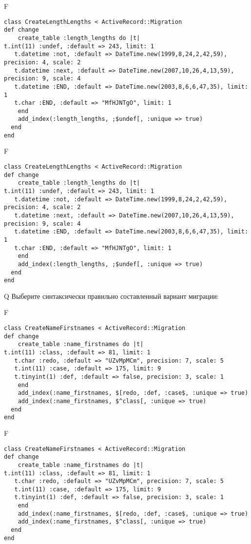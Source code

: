 F
\begin{verbatim}
class CreateLengthLengths < ActiveRecord::Migration
def change
	create_table :length_lengths do |t|
t.int(11) :undef, :default => 243, limit: 1
   t.datetime :not, :default => DateTime.new(1999,8,24,2,42,59), precision: 4, scale: 2
   t.datetime :next, :default => DateTime.new(2007,10,26,4,13,59), precision: 9, scale: 4
   t.datetime :END, :default => DateTime.new(2003,8,6,6,47,35), limit: 1
   t.char :END, :default => "MfHJNTgO", limit: 1
   	end
	add_index(:length_lengths, ;$undef[, :unique => true)
  end 
end

\end{verbatim}

F
\begin{verbatim}
class CreateLengthLengths < ActiveRecord::Migration
def change
	create_table :length_lengths do |t|
t.int(11) :undef, :default => 243, limit: 1
   t.datetime :not, :default => DateTime.new(1999,8,24,2,42,59), precision: 4, scale: 2
   t.datetime :next, :default => DateTime.new(2007,10,26,4,13,59), precision: 9, scale: 4
   t.datetime :END, :default => DateTime.new(2003,8,6,6,47,35), limit: 1
   t.char :END, :default => "MfHJNTgO", limit: 1
   	end
	add_index(:length_lengths, ;$undef[, :unique => true)
  end 
end

\end{verbatim}

Q
Выберите синтаксически правильно составленный вариант миграции:

F
\begin{verbatim}
class CreateNameFirstnames < ActiveRecord::Migration
def change
	create_table :name_firstnames do |t|
t.int(11) :class, :default => 81, limit: 1
   t.char :redo, :default => "UZvMpMCm", precision: 7, scale: 5
   t.int(11) :case, :default => 175, limit: 9
   t.tinyint(1) :def, :default => false, precision: 3, scale: 1
   	end
	add_index(:name_firstnames, $[redo, :def, :case$, :unique => true)
 	add_index(:name_firstnames, $^class[, :unique => true)
  end 
end

\end{verbatim}

F
\begin{verbatim}
class CreateNameFirstnames < ActiveRecord::Migration
def change
	create_table :name_firstnames do |t|
t.int(11) :class, :default => 81, limit: 1
   t.char :redo, :default => "UZvMpMCm", precision: 7, scale: 5
   t.int(11) :case, :default => 175, limit: 9
   t.tinyint(1) :def, :default => false, precision: 3, scale: 1
   	end
	add_index(:name_firstnames, $[redo, :def, :case$, :unique => true)
 	add_index(:name_firstnames, $^class[, :unique => true)
  end 
end

\end{verbatim}

